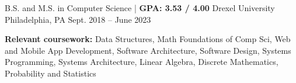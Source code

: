 

\begin{cventries}

  \cventry
  {B.S. and M.S. in Computer Science | \textbf{ GPA: 3.53 / 4.00}} %
  {Drexel University} %
  {Philadelphia, PA} %
  {Sept. 2018 -- June 2023} %
  {
    \begin{cvitems} %
      \item {\color{darktext} \textbf{Relevant coursework:}} Data Structures, Math Foundations of Comp Sci, Web and Mobile App Development,
      Software Architecture, Software Design, Systems Programming, Systems Architecture,
      Linear Algebra, Discrete Mathematics, Probability and Statistics
    \end{cvitems}
  }

\end{cventries}
